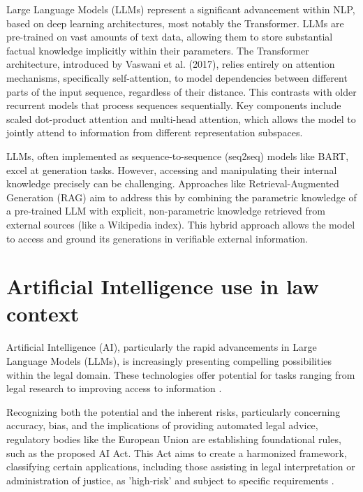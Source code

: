 \documentclass[../main.tex]{subfiles}
\begin{document}
Large Language Models (LLMs) represent a significant advancement within NLP, based on deep learning architectures, most notably the Transformer. LLMs are pre-trained on vast amounts of text data, allowing them to store substantial factual knowledge implicitly within their parameters. The Transformer architecture, introduced by Vaswani et al. (2017)\cite{vaswaniAttentionAllYou2023}, relies entirely on attention mechanisms, specifically self-attention, to model dependencies between different parts of the input sequence, regardless of their distance. This contrasts with older recurrent models that process sequences sequentially. Key components include scaled dot-product attention  and multi-head attention, which allows the model to jointly attend to information from different representation subspaces.

LLMs, often implemented as sequence-to-sequence (seq2seq) models like BART, excel at generation tasks. However, accessing and manipulating their internal knowledge precisely can be challenging. Approaches like Retrieval-Augmented Generation (RAG) aim to address this by combining the parametric knowledge of a pre-trained LLM with explicit, non-parametric knowledge retrieved from external sources (like a Wikipedia index)\cite{lewisRetrievalAugmentedGenerationKnowledgeIntensive2021}. This hybrid approach allows the model to access and ground its generations in verifiable external information. 
\cite{prince2023understanding}


\section{Artificial Intelligence use in law context}
Artificial Intelligence (AI), particularly the rapid advancements in Large Language Models (LLMs), is increasingly presenting compelling possibilities within the legal domain. These technologies offer potential for tasks ranging from legal research to improving access to information \cite{cheongAIAmNot2024}.

Recognizing both the potential and the inherent risks, particularly concerning accuracy, bias, and the implications of providing automated legal advice, regulatory bodies like the European Union are establishing foundational rules, such as the proposed AI Act. This Act aims to create a harmonized framework, classifying certain applications, including those assisting in legal interpretation or administration of justice, as 'high-risk' and subject to specific requirements \cite{ProposalREGULATIONEUROPEAN2021}. 
\end{document}
